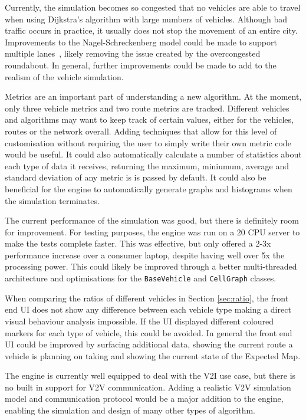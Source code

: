 \documentclass[ %
                    author={Alexander Hill},
                supervisor={Dr. Benjamin Sach},
                    degree={MEng},
                     title={MARMOSET},
                  subtitle={Multi-Agent Route Management using Online Simulation for Efficient Transportation},
                      type={research},
                      year={2016} ]{dissertation}
\begin{document}
Currently, the simulation becomes so congested that no vehicles are able to
travel when using Dijkstra's algorithm with large numbers of vehicles. Although
bad traffic occurs in practice, it usually does not stop the movement of an
entire city. Improvements to the Nagel-Schreckenberg model could be made to
support multiple lanes~\cite{nlanes}, likely removing the issue created by the
overcongested roundabout. In general, further improvements could be made to add
to the realism of the vehicle simulation.

Metrics are an important part of understanding a new algorithm. At the
moment, only three vehicle metrics and two route metrics are tracked.
Different vehicles and algorithms may want to keep track of certain values,
either for the vehicles, routes or the network overall. Adding techniques that
allow for this level of customisation without requiring the user to simply write
their own metric code would be useful. It could also automatically calculate a
number of statistics about each type of data it receives, returning the maximum,
miniumum, average and standard deviation of any metric is is passed by default.
It could also be beneficial for the engine to automatically generate graphs and
histograms when the simulation terminates.

The current performance of the simulation was good, but there is definitely room
for improvement. For testing purposes, the engine was run on a 20 CPU server to
make the tests complete faster. This was effective, but only offered a 2-3x
performance increase over a consumer laptop, despite having well over 5x the
processing power. This could likely be improved through a better multi-threaded
architecture and optimisations for the \texttt{BaseVehicle} and
\texttt{CellGraph} classes.

When comparing the ratios of different vehicles in Section \ref{sec:ratio}, the
front end UI does not show any difference between each vehicle type making a
direct visual behaviour analysis impossible. If the UI displayed different
coloured markers for each type of vehicle, this could be avoided. In general the
front end UI could be improved by surfacing additional data, showing the
current route a vehicle is planning on taking and showing the current state of
the Expected Map.

The engine is currently well equipped to deal with the V2I use case, but there
is no built in support for V2V communication. Adding a realistic V2V simulation
model and communication protocol would be a major addition to the engine,
enabling the simulation and design of many other types of algorithm.
\end{document}
